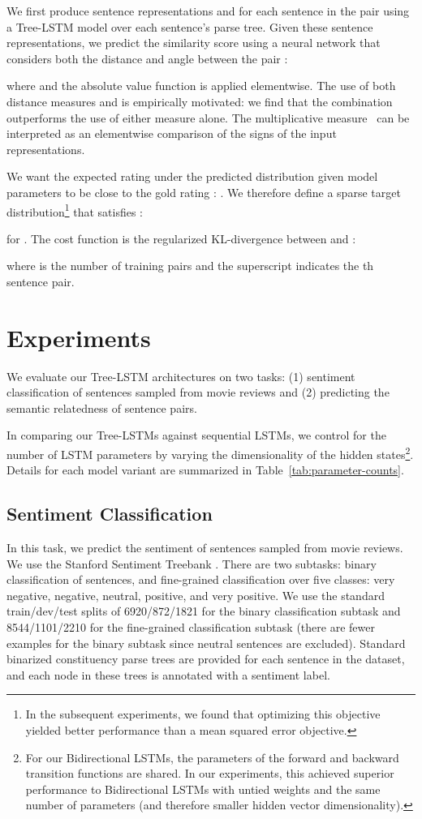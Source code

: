 \documentclass[11pt]{article}
\begin{document}
We first produce sentence representations  and  for each sentence in the pair using a Tree-LSTM model over each sentence's parse tree. Given these sentence representations, we predict the similarity score  using a neural network that considers both the distance and angle between the pair :

where  and the absolute value function is applied elementwise. The use of both distance measures  and  is empirically motivated: we find that the combination outperforms the use of either measure alone. The  multiplicative measure~ can be interpreted as an elementwise comparison of the signs of the input representations.

We want the expected rating under the predicted distribution  given model parameters  to be close to the gold rating : . We therefore define a sparse target distribution\footnote{In the subsequent experiments, we found that optimizing this objective yielded better performance than a mean squared error objective.}  that satisfies :

for . The cost function is the regularized KL-divergence between  and :

where  is the number of training pairs and the superscript  indicates the th sentence pair.

\section{Experiments}

We evaluate our Tree-LSTM architectures on two tasks: (1) sentiment classification of sentences sampled from movie reviews and (2) predicting the semantic relatedness of sentence pairs.

In comparing our Tree-LSTMs against sequential LSTMs, we control for the number of LSTM parameters by varying the dimensionality of the hidden states\footnote{For our Bidirectional LSTMs, the parameters of the forward and backward transition functions are shared. In our experiments, this achieved superior performance to Bidirectional LSTMs with untied weights and the same number of parameters (and therefore smaller hidden vector dimensionality).}. Details for each model variant are summarized in Table~\ref{tab:parameter-counts}.

\subsection{Sentiment Classification}

In this task, we predict the sentiment of sentences sampled from movie reviews. We use the Stanford Sentiment Treebank \citep{socher2013recursive}. There are two subtasks: binary classification of sentences, and fine-grained classification over five classes: very negative, negative, neutral, positive, and very positive. We use the standard train/dev/test splits of 6920/872/1821 for the binary classification subtask and 8544/1101/2210 for the fine-grained classification subtask (there are fewer examples for the binary subtask since neutral sentences are excluded). Standard binarized constituency parse trees are provided for each sentence in the dataset, and each node in these trees is annotated with a sentiment label.
\end{document}
